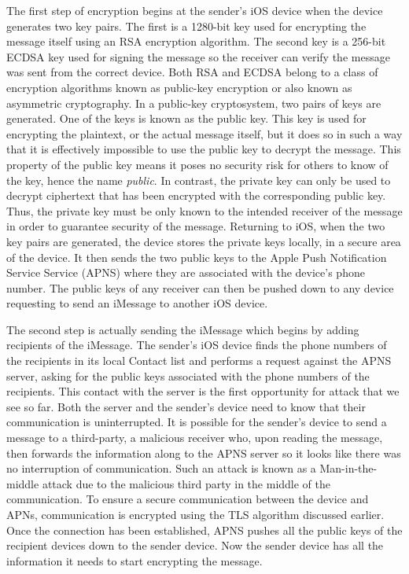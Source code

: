 The first step of encryption begins at the sender's iOS device when the device
generates two key pairs\cite{apple}.  The first is a 1280-bit key used for encrypting the
message itself using an RSA encryption algorithm.  The second key is a 256-bit
ECDSA key used for signing the message so the receiver can verify the message
was sent from the correct device.  Both RSA and ECDSA 
belong to a class of encryption algorithms known as public-key encryption or
also known as asymmetric cryptography\cite{trappe}. In a public-key cryptosystem, two pairs
of keys are generated.  One of the keys is known as the public key.  This key
is used for encrypting the plaintext, or the actual message itself, but it does
so in such a way that it is effectively impossible to use the public key to
decrypt the message.  This property of the public key means it poses no
security risk for others to know of the key, hence the name \textit{public}.  In
contrast, the private key can only be used to decrypt ciphertext that has been
encrypted with the corresponding public key.  Thus, the private key must be
only known to the intended receiver of the message in order to guarantee
security of the message.  Returning to iOS, when the two key pairs are
generated, the device stores the private keys locally, in a secure area of the
device.  It then sends the two public keys to the Apple Push Notification
Service Service (APNS) where they are associated with the device's phone number.
The public keys of any receiver can then be pushed down to any device
requesting to send an iMessage to another iOS device\cite{apple}.

The second step is actually sending the iMessage which begins by adding
recipients of the iMessage.  The sender's iOS device finds the phone numbers of
the recipients in its local Contact list and performs a request against the
APNS server, asking for the public keys associated with the phone numbers of
the recipients\cite{apple}.  This contact with the server is the first opportunity for
attack that we see so far.  Both the server and the sender's device need to
know that their communication is uninterrupted.  It is possible for the
sender's device to send a message to a third-party, a malicious receiver who,
upon reading the message, then forwards the information along to the APNS
server so it looks like there was no interruption of communication.  Such an
attack is known as a Man-in-the-middle attack due to the malicious third party
in the middle of the communication.  To ensure a secure communication between
the device and APNs, communication is encrypted using the TLS algorithm
discussed earlier.  Once the connection has been established, APNS pushes all
the public keys of the recipient devices down to the sender device.  Now the
sender device has all the information it needs to start encrypting the message.

